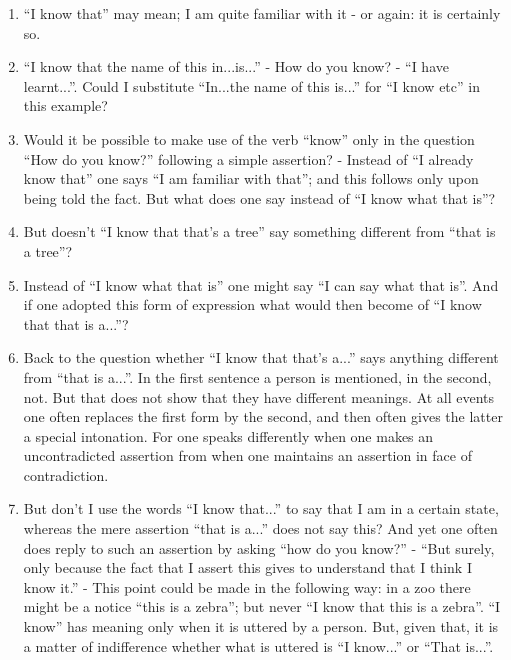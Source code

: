 \documentclass{book}
\begin{document}
\begin{enumerate}
\item
``I know that'' may mean; I am quite familiar with it - or again: it is
certainly so.

\item
``I know that the name of this in...is...'' - How do you know? - ``I have
learnt...''.  Could I substitute ``In...the name of this is...'' for ``I know
etc'' in this example?

\item
Would it be possible to make use of the verb ``know'' only in the question
``How do you know?'' following a simple assertion? - Instead of ``I already
know that'' one says ``I am familiar with that''; and this follows only upon
being told the fact. But what does one say instead of ``I know what that is''?

\item
But doesn't ``I know that that's a tree'' say something different from ``that
is a tree''?

\item
Instead of ``I know what that is'' one might say ``I can say what that is''.
And if one adopted this form of expression what would then become of ``I know
that that is a...''?

\item
Back to the question whether ``I know that that's a...'' says anything
different from ``that is a...''. In the first sentence a person is mentioned,
in the second, not. But that does not show that they have different meanings.
At all events one often replaces the first form by the second, and then often
gives the latter a special intonation. For one speaks differently when one
makes an uncontradicted assertion from when one maintains an assertion in face
of contradiction.

\item
But don't I use the words ``I know that...'' to say that I am in a certain
state, whereas the mere assertion ``that is a...'' does not say this? And yet
one often does reply to such an assertion by asking ``how do you know?'' -
``But surely, only because the fact that I assert this gives to understand that
I think I know it.'' - This point could be made in the following way: in a zoo
there might be a notice ``this is a zebra''; but never ``I know that this is a
zebra''.  ``I know'' has meaning only when it is uttered by a person. But,
given that, it is a matter of indifference whether what is uttered is ``I
know...'' or ``That is...''.


\end{enumerate}
\end{document}

